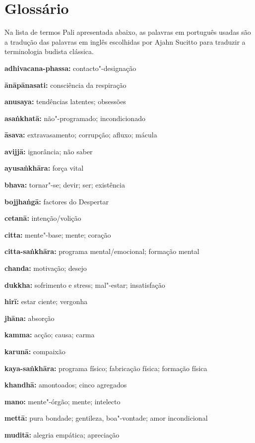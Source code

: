 \chapter{Glossário}

Na lista de termos Pali apresentada abaixo, as palavras em português usadas são
a tradução das palavras em inglês escolhidas por Ajahn Sucitto para traduzir a
terminologia budista clássica.

\bigskip

\setlength{\parskip}{10pt}

\textbf{adhivacana-phassa:} contacto"-designação

\textbf{ānāpānasati:} consciência da respiração

\textbf{anusaya:} tendências latentes; obsessões

\textbf{asaṅkhatā:} não"-programado; incondicionado

\textbf{āsava:} extravasamento; corrupção; afluxo; mácula

\textbf{avijjā:} ignorância; não saber

\textbf{ayusaṅkhāra:} força vital

\textbf{bhava:} tornar"-se; devir; ser; existência

\textbf{bojjhaṅgā:} factores do Despertar

\textbf{cetanā:} intenção/volição

\textbf{citta:} mente"-base; mente; coração

\textbf{citta-saṅkhāra:} programa mental/emocional; formação \mbox{mental}

\textbf{chanda:} motivação; desejo

\textbf{dukkha:} sofrimento e stress; mal"-estar; insatisfação

\textbf{hirī:} estar ciente; vergonha

\textbf{jhāna:} absorção

\textbf{kamma:} acção; causa; carma

\textbf{karunā:} compaixão

\textbf{kaya-saṅkhāra:} programa físico; fabricação física; formação física

\textbf{khandhā:} amontoados; cinco agregados

\textbf{mano:} mente"-órgão; mente; intelecto

\textbf{mettā:} pura bondade; gentileza, boa"-vontade; amor incondicional

\textbf{muditā:} alegria empática; apreciação

